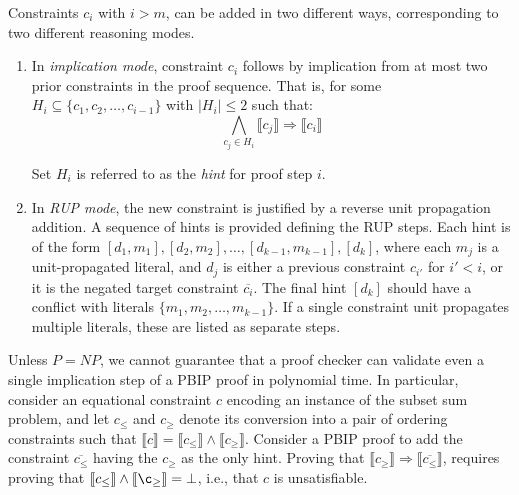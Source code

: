 \documentclass{fmcad}
\begin{document}
Constraints $c_i$ with $i > m$, can be added in two different ways, corresponding to two
different reasoning modes.

\begin{enumerate}
\item In \textit{implication mode}, constraint $c_i$ follows by implication from at most two prior
  constraints in the proof sequence. That is, for some $H_i \subseteq \{c_1, c_2, \dots, c_{i - 1}\}$
  with $|H_i| \leq 2$ such that:
  \begin{equation}
    \label{eq:clausal-hints}
    \bigwedge_{c_j \in H_i} \llbracket c_j \rrbracket \Rightarrow \llbracket c_i \rrbracket
  \end{equation}

  Set $H_i$  is referred to as the \textit{hint} for proof step $i$.
\item In \textit{RUP mode}, the new constraint is justified by a reverse unit propagation addition.
  A sequence of hints is provided defining the RUP steps. Each hint is of the form $[d_1, m_1],
  [d_2, m_2], \dots, [d_{k - 1}, m_{k - 1}], [d_k]$, where each $m_j$ is a unit-propagated literal,
  and $d_j$ is either a previous constraint $c_{i'}$ for $i' < i$, or it is the negated target
  constraint $\overline{c_i}$. The final hint $[d_k]$ should have a conflict with literals
  $\{m_1, m_2, \dots, m_{k - 1}\}$. If a single constraint unit propagates multiple literals,
  these are listed as separate steps.
\end{enumerate}

Unless $P = NP$, we cannot guarantee that a proof checker can validate even a single implication
step of a PBIP proof in polynomial time. In particular, consider an equational constraint $c$
encoding an instance of the subset sum problem, and let $c_{\leq}$ and $c_{\geq}$ denote its conversion
into a pair of ordering constraints such that $\llbracket c \rrbracket = \llbracket c_{\leq}
\rrbracket \land \llbracket c_\geq \rrbracket$. Consider a PBIP proof to add the constraint
$\overline{c_{\leq}}$ having the $c_{\geq}$ as the only hint. Proving that
$\llbracket c_\geq \rrbracket \Rightarrow \llbracket \overline{c_\leq} \rrbracket$, requires proving
that $\llbracket c_\leq \rrbracket \land \llbracket \c_\geq \rrbracket = \bot$, i.e., that
$c$ is unsatisfiable.
\end{document}
